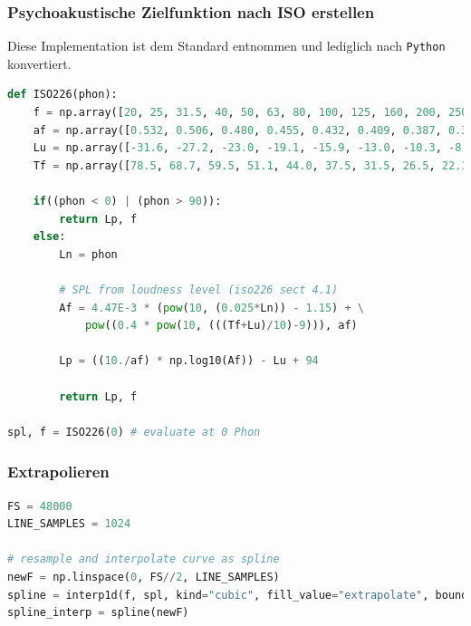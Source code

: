 \hypertarget{psychoakustische-zielfunktion-nach-iso-erstellen}{%
\subsubsection{Psychoakustische Zielfunktion nach ISO
erstellen}\label{psychoakustische-zielfunktion-nach-iso-erstellen}}

Diese Implementation ist dem Standard entnommen und lediglich nach
\texttt{Python} konvertiert.

\begin{lstlisting}[language=Python]
def ISO226(phon):
    f = np.array([20, 25, 31.5, 40, 50, 63, 80, 100, 125, 160, 200, 250, 315, 400, 500, 630, 800, 1000, 1250, 1600, 2000, 2500, 3150, 4000, 5000, 6300, 8000, 10000, 12500])
    af = np.array([0.532, 0.506, 0.480, 0.455, 0.432, 0.409, 0.387, 0.367, 0.349, 0.330, 0.315, 0.301, 0.288, 0.276, 0.267, 0.259, 0.253, 0.250, 0.246, 0.244, 0.243, 0.243, 0.243, 0.242, 0.242, 0.245, 0.254, 0.271, 0.301])
    Lu = np.array([-31.6, -27.2, -23.0, -19.1, -15.9, -13.0, -10.3, -8.1, -6.2, -4.5, -3.1, -2.0, -1.1, -0.4, 0.0, 0.3, 0.5, 0.0, -2.7, -4.1, -1.0, 1.7, 2.5, 1.2, -2.1, -7.1, -11.2, -10.7, -3.1])
    Tf = np.array([78.5, 68.7, 59.5, 51.1, 44.0, 37.5, 31.5, 26.5, 22.1, 17.9, 14.4, 11.4, 8.6, 6.2, 4.4, 3.0, 2.2, 2.4, 3.5, 1.7, -1.3, -4.2, -6.0, -5.4, -1.5, 6.0, 12.6, 13.9, 12.3])

    if((phon < 0) | (phon > 90)):
        return Lp, f
    else:
        Ln = phon

        # SPL from loudness level (iso226 sect 4.1)
        Af = 4.47E-3 * (pow(10, (0.025*Ln)) - 1.15) + \
            pow((0.4 * pow(10, (((Tf+Lu)/10)-9))), af)

        Lp = ((10./af) * np.log10(Af)) - Lu + 94

        return Lp, f

spl, f = ISO226(0) # evaluate at 0 Phon
\end{lstlisting}

\hypertarget{extrapolieren}{%
\subsubsection{Extrapolieren}\label{extrapolieren}}

\begin{lstlisting}[language=Python]
FS = 48000
LINE_SAMPLES = 1024

# resample and interpolate curve as spline
newF = np.linspace(0, FS//2, LINE_SAMPLES)
spline = interp1d(f, spl, kind="cubic", fill_value="extrapolate", bounds_error=False)
spline_interp = spline(newF)
\end{lstlisting}

